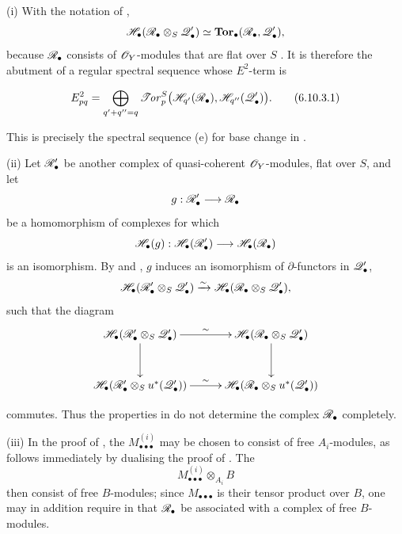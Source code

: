 \begin{remarks}[6.10.3]
\label{III.6.10.3}
\textnormal{(i)}
With the notation of ,
\[
  \mathscr{H}_\bullet
  (\mathscr{R}_\bullet\otimes_S\mathscr{Q}_\bullet')
  \simeq
  \mathbf{Tor}_\bullet(\mathscr{R}_\bullet,\mathscr{Q}_\bullet'),
\]
because $\mathscr{R}_\bullet$ consists of $\mathscr{O}_Y$-modules that are
flat over $S$ .  It is therefore
 the abutment of a regular spectral sequence
whose $E^2$-term is
\begin{env}[6.10.3.1]
\label{III.6.10.3.1}
\[
  E^2_{pq}
  =
  \bigoplus_{q'+q''=q}
  \mathscr{T}\!\mathit{or}_p^S
  \bigl(
    \mathscr{H}_{q'}(\mathscr{R}_\bullet),
    \mathscr{H}_{q''}(\mathscr{Q}_\bullet')
  \bigr).
  \tag{6.10.3.1}\label{III.6.10.3.1.eq}
\]
\end{env}
This is precisely the spectral sequence (e) for base change in
.

\medskip
\textnormal{(ii)}
Let $\mathscr{R}_\bullet'$ be another complex of quasi-coherent
$\mathscr{O}_Y$-modules, flat over $S$, and let
\[
  g:\mathscr{R}_\bullet'\longrightarrow\mathscr{R}_\bullet
\]
be a homomorphism of complexes for which
\[
  \mathscr{H}_\bullet(g):
  \mathscr{H}_\bullet(\mathscr{R}_\bullet')
  \longrightarrow
  \mathscr{H}_\bullet(\mathscr{R}_\bullet)
\]
is an isomorphism.  By  and
, $g$ induces an isomorphism of
$\partial$-functors in $\mathscr{Q}_\bullet'$,
\[
  \mathscr{H}_\bullet
  (\mathscr{R}_\bullet'\otimes_S\mathscr{Q}_\bullet')
  \xrightarrow{\sim}
  \mathscr{H}_\bullet
  (\mathscr{R}_\bullet\otimes_S\mathscr{Q}_\bullet'),
\]
such that the diagram
\[
\xymatrix@C=28pt@R=30pt{
  \sh H_\bullet
  (\sh R_\bullet'\otimes_S\sh Q_\bullet')
  \ar[r]^-{\sim}\ar[d]
  &
  \sh H_\bullet
  (\sh R_\bullet\otimes_S\sh Q_\bullet')
  \ar[d]
  \\
  \sh H_\bullet
  (\sh R_\bullet'\otimes_Su^*(\sh Q_\bullet'))
  \ar[r]^-{\sim}
  &
  \sh H_\bullet
  (\sh R_\bullet\otimes_Su^*(\sh Q_\bullet'))
}
\]
\par\medskip\noindent
commutes.  Thus the properties in  do not
determine the complex $\mathscr{R}_\bullet$ completely.

\medskip
{}
\textnormal{(iii)}
In the proof of , the
$M_{\bullet\bullet\bullet}^{(i)}$ may be chosen to consist of
free $A_i$-modules, as follows immediately by dualising the
proof of .  The
\[
  M_{\bullet\bullet\bullet}^{(i)}\otimes_{A_i}B
\]
then consist of free $B$-modules; since
$M_{\bullet\bullet\bullet}$ is their tensor product over $B$,
one may in addition require in  that
$\mathscr{R}_\bullet$ be associated with a complex of free
$B$-modules.


\end{remarks}
